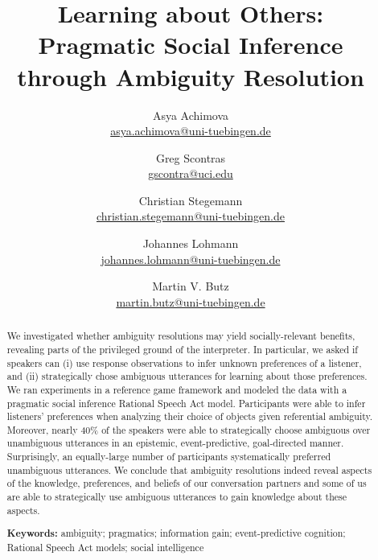 \documentclass[10pt,a4paper]{article}
\title{Learning about Others:\\
	Pragmatic Social Inference \\ through Ambiguity Resolution
}
\author{
		Asya Achimova\\
		\href{mailto:asya.achimova@uni-tuebingen.de}{asya.achimova@uni-tuebingen.de}
	\and
		Greg Scontras\\
		\href{mailto:gscontra@uci.edu}{gscontra@uci.edu}
	\and 
		Christian Stegemann\\
		\href{mailto:christian.stegemann@uni-tuebingen.de}{christian.stegemann@uni-tuebingen.de}
	\and
		Johannes Lohmann\\
		\href{mailto:johannes.lohmann@uni-tuebingen.de}{johannes.lohmann@uni-tuebingen.de}
	\and
		Martin V. Butz \\
		\href{mailto:martin.butz@uni-tuebingen.de}{martin.butz@uni-tuebingen.de}
}
\begin{document}
\maketitle

\begin{abstract}
We investigated whether ambiguity resolutions may yield socially-relevant benefits,
revealing parts of the privileged ground of the interpreter. 
In particular, we asked if speakers can (i) use response observations to infer unknown preferences of a listener, and (ii) strategically chose ambiguous utterances for learning about those preferences. 
We ran experiments in a reference game framework and modeled the data with a pragmatic social inference Rational Speech Act model.
Participants were able to infer listeners' preferences when analyzing their choice of objects given referential ambiguity.
Moreover, nearly 40\% of the speakers were able to strategically choose ambiguous over unambiguous utterances in an epistemic, event-predictive, goal-directed manner.
Surprisingly, an equally-large number of participants systematically preferred unambiguous utterances. 
We conclude that ambiguity resolutions indeed reveal aspects of the knowledge, preferences, and beliefs of our conversation partners and some of us are able to strategically use ambiguous utterances to gain knowledge about these aspects.

\textbf{Keywords:} 
ambiguity; pragmatics; information gain; event-predictive cognition; Rational Speech Act models; social intelligence
\end{abstract}
\end{document}
